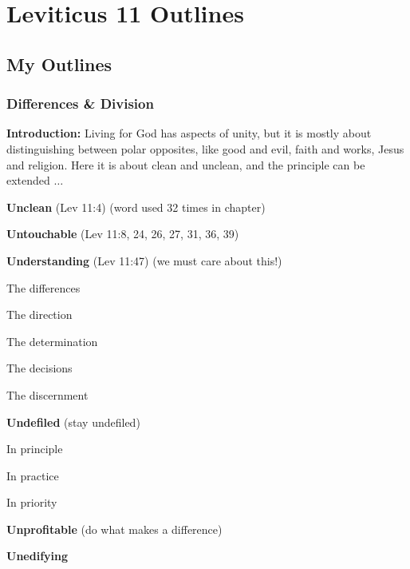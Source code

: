 \section{Leviticus  11 Outlines}

\subsection{My Outlines}

\subsubsection{Differences \& Division}
\textbf{Introduction: }Living for God has aspects of unity, but it is mostly about distinguishing between polar opposites, like good and evil, faith and works, Jesus and religion. Here it is about clean and unclean, and the principle can be extended $\hdots$
\begin{compactenum}[I.][7]
    \item \textbf{Unclean}  (Lev 11:4) (word used 32 times in chapter)
    \item \textbf{Untouchable}  (Lev 11:8, 24, 26, 27, 31, 36, 39)
    \item \textbf{Understanding}  (Lev 11:47) (we must care about this!)
    \begin{compactenum}[A.][7]
    	\item The differences
    	\item The direction
    	\item The determination
    	\item The decisions
    	\item The discernment
    \end{compactenum}
    \item \textbf{Undefiled} (stay undefiled)
    \begin{compactenum}[A.][7]
    	\item In principle
    	\item In practice
    	\item In priority
    \end{compactenum}
    \item \textbf{Unprofitable} (do what makes a difference)
    \item \textbf{Unedifying} 
\end{compactenum}
